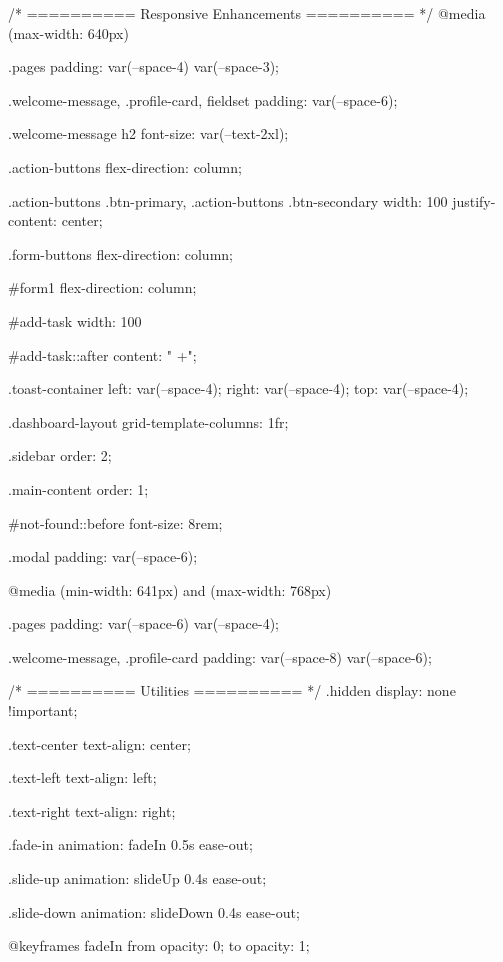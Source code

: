 /* ========== Responsive Enhancements ========== */
@media (max-width: 640px) {
  .pages {
    padding: var(--space-4) var(--space-3);
  }
  
  .welcome-message, .profile-card, fieldset {
    padding: var(--space-6);
  }
  
  .welcome-message h2 {
    font-size: var(--text-2xl);
  }
  
  .action-buttons {
    flex-direction: column;
  }
  
  .action-buttons .btn-primary,
  .action-buttons .btn-secondary {
    width: 100%
    justify-content: center;
  }
  
  .form-buttons {
    flex-direction: column;
  }
  
  #form1 {
    flex-direction: column;
  }
  
  #add-task {
    width: 100%
  }
  
  #add-task::after {
    content: " +";
  }
  
  .toast-container {
    left: var(--space-4);
    right: var(--space-4);
    top: var(--space-4);
  }
  
  .dashboard-layout {
    grid-template-columns: 1fr;
  }
  
  .sidebar {
    order: 2;
  }
  
  .main-content {
    order: 1;
  }
  
  #not-found::before {
    font-size: 8rem;
  }
  
  .modal {
    padding: var(--space-6);
  }
}

@media (min-width: 641px) and (max-width: 768px) {
  .pages {
    padding: var(--space-6) var(--space-4);
  }
  
  .welcome-message, .profile-card {
    padding: var(--space-8) var(--space-6);
  }
}

/* ========== Utilities ========== */
.hidden {
  display: none !important;
}

.text-center {
  text-align: center;
}

.text-left {
  text-align: left;
}

.text-right {
  text-align: right;
}

.fade-in {
  animation: fadeIn 0.5s ease-out;
}

.slide-up {
  animation: slideUp 0.4s ease-out;
}

.slide-down {
  animation: slideDown 0.4s ease-out;
}

@keyframes fadeIn {
  from {
    opacity: 0;
  }
  to {
    opacity: 1;
  }
}

